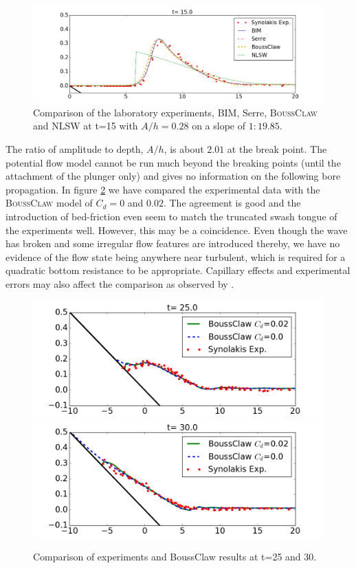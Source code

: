 \documentclass[review]{elsarticle}
\newcommand{\BoussClaw}{\textsc{BoussClaw} }
\begin{document}
\begin{figure}[!htb]
\centering
\includegraphics[width=\textwidth]{_fig/lab_bim_bouss_t15.png}
\caption{Comparison of the laboratory experiments, BIM, Serre, \BoussClaw and NLSW at t=15 with $A/h=0.28$ 
on a slope of $1:19.85$.}
\label{fig:lab_bim}
\end{figure}

The ratio of amplitude to depth, $A/h$, 
is about $2.01$ at the break point.
The potential flow model cannot be run much beyond the
breaking points (until the attachment of the plunger only) and 
gives no information on the following bore propagation.
In figure \ref{fig:BoussClaw_runup} we have compared
the experimental data with the \BoussClaw model 
of $C_d = 0$ and $0.02$. 
The agreement is good and the introduction of bed-friction 
even seem to match the truncated swash tongue of the experiments well. However, this may be a coincidence. 
Even though the  wave has broken and some irregular flow features are introduced thereby, we have no evidence of the flow state being
anywhere near turbulent, which is required for a quadratic bottom resistance to be appropriate. 
Capillary effects and 
experimental errors may also affect the comparison
as observed by \cite{Pedersen:2013}.

\begin{figure}[tbh!]
	\centering
	\includegraphics[width=.8\textwidth]{_fig/BoussClaw_lab_Cd_t25}\\
	\includegraphics[width=.8\textwidth]{_fig/BoussClaw_lab_Cd_t30}
	\caption{Comparison of experiments and BoussClaw results 
		at t=25 and 30.}
	\label{fig:BoussClaw_runup}
\end{figure}
\end{document}
